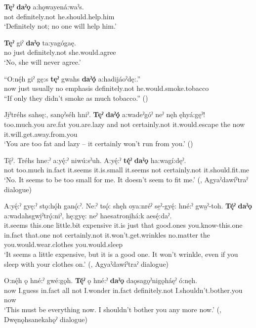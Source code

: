 \ea
\label{ex:tpart13}
\gll \textbf{Tęˀ} \textbf{daˀǫ}  a:hǫwayená:waˀs.\\
not definitely.not he.should.help.him\\
\glt ‘Definitely not; no one will help him.’
\z

\ea
\label{ex:tpart14}
\gll \textbf{Tęˀ} giˀ \textbf{daˀǫ} ta:yagógaę.\\
no just definitely.not she.would.agree\\
\glt ‘No, she will never agree.’
\z

\ea
\label{ex:tpart15}
\gll “O:nę́h giˀ gę:s \textbf{tęˀ} gwahs \textbf{daˀǫ́} a:hadijáoˀdę:.”\\
now just usually no emphasis definitely.not he.would.smoke.tobacco\\
\glt “If only they didn’t smoke as much tobacco.” (\cite{henry_de_2005})
\z

\ea
\label{ex:tpart16}
\gll Ji̱ˀtréhs sahsę:, sanǫˀséh hniˀ. \textbf{Tęˀ} \textbf{daˀǫ́} a:wadeˀgóˀ neˀ nęh ęhyá:gęˀ!\\
too.much.you are.fat you.are.lazy and not certainly.not it.would.escape the now it.will.get.away.from.you\\
\glt ‘You are too fat and lazy – it certainly won’t run from you.’ (\cite{carrier_legends_2013})
\z

\ea
\label{ex:tpart17}
\gll Tę́ˀ. Tréhs hne:ˀ a:yę́:ˀ niwú:sˀuh. A:yę́:ˀ \textbf{tę́ˀ} \textbf{daˀǫ} ha:wagí:dęˀ.\\
not too.much in.fact it.seems it.is.small it.seems not certainly.not it.should.fit.me\\
\glt ‘No. It seems to be too small for me. It doesn’t seem to fit me.’ (\cite[225]{mithun_watewayestanih_1984}, Agyaˀdawíˀtraˀ dialogue)
\z

\ea
\label{ex:tpart18}
\gll A:yę́:ˀ gyę:ˀ stǫ:hǫ́h ganǫ́:ˀ. Ne:ˀ tsǫ́: shęh oya:nréˀ se̱ˀ-gyę́: hné:ˀ gwa̱ˀ-toh. \textbf{Tę́ˀ} \textbf{daˀǫ} a:wadahsgwi̱ˀtrǫ́:niˀ, hę:gyę: neˀ haesatroni̱há:k aesę́:daˀ.\\
it.seems this.one little.bit expensive it.is just that good.ones you.know-this.one in.fact that.one not certainly.not it.won’t.get.wrinkles no.matter the you.would.wear.clothes you.would.sleep\\
\glt ‘It seems a little expensive, but it is a good one. It won’t wrinkle, even if you sleep with your clothes on.’ (\cite[225]{mithun_watewayestanih_1984}, Agyaˀdawíˀtraˀ dialogue)
\z

\ea
\label{ex:tpart19}
\gll O:nę́h ǫ hné:ˀ gwé:gǫh. \textbf{Tę́ˀ} ǫ hné:ˀ \textbf{daˀǫ} daǫsagǫˀnigǫháęˀ ó:nęh.\\
now I.guess in.fact all not I.wonder in.fact definitely.not I.shouldn’t.bother.you now\\
\glt ‘This must be everything now. I shouldn’t bother you any more now.’ (\cite[441]{mithun_watewayestanih_1984}, Dwęnǫhsanekahǫˀ dialogue)
\z

